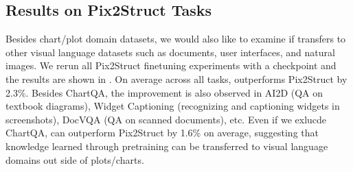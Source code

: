 
\subsection{Results on Pix2Struct Tasks}\label{sec:p2s_tasks}

Besides chart/plot domain datasets, we would also like to examine if \model{} transfers to other visual language datasets such as documents, user interfaces, and natural images. We rerun all Pix2Struct finetuning experiments with a \model{} checkpoint and the results are shown in . On average across all tasks, \model{} outperforms Pix2Struct by 2.3\%. Besides ChartQA, the improvement is also observed in AI2D (QA on textbook diagrams), Widget Captioning (recognizing and captioning widgets in screenshots), DocVQA (QA on scanned documents), etc. Even if we exlucde ChartQA, \model{} can outperform Pix2Struct by 1.6\% on average, suggesting that knowledge learned through \model{} pretraining can be transferred to visual language domains out side of plots/charts.

\begin{table}[!ht]
    \centering
\setlength{\tabcolsep}{5pt}
    \caption{\model{} vs. Pix2Sturct on Pix2Sturct tasks.}
    \label{tab:matcha_vs_p2s}
\end{table}


